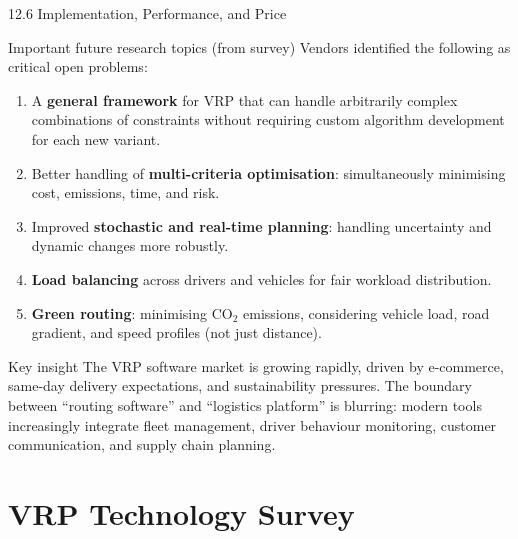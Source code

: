 \documentclass[aspectratio=169,10pt]{beamer}
\begin{document}
\begin{frame}[allowframebreaks]{12.6 \; Implementation, Performance, and Price}
  \begin{block}{Important future research topics (from survey)}
    Vendors identified the following as critical open problems:
    \begin{enumerate}
      \item A \textbf{general framework} for VRP that can handle
            arbitrarily complex combinations of constraints without
            requiring custom algorithm development for each new variant.
      \item Better handling of \textbf{multi-criteria optimisation}:
            simultaneously minimising cost, emissions, time, and risk.
      \item Improved \textbf{stochastic and real-time planning}:
            handling uncertainty and dynamic changes more robustly.
      \item \textbf{Load balancing} across drivers and vehicles
            for fair workload distribution.
      \item \textbf{Green routing}: minimising CO$_2$ emissions,
            considering vehicle load, road gradient, and speed profiles
            (not just distance).
    \end{enumerate}
  \end{block}

  \begin{alertblock}{Key insight}
    The VRP software market is growing rapidly, driven by e-commerce,
    same-day delivery expectations, and sustainability pressures.
    The boundary between ``routing software'' and ``logistics platform''
    is blurring: modern tools increasingly integrate fleet management,
    driver behaviour monitoring, customer communication, and
    supply chain planning.
  \end{alertblock}
\end{frame}

\section{VRP Technology Survey}
\end{document}
